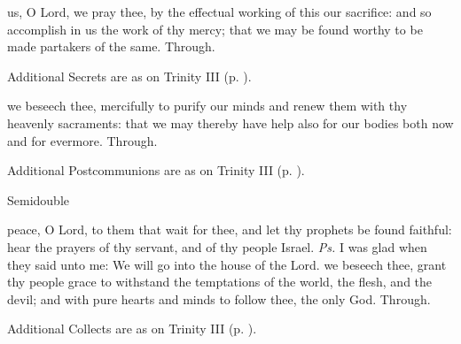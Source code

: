\vspace{-1ex}
\secret
{} us, O Lord, we pray thee, by the effectual working of this our sacrifice: and so accomplish in us the work of thy mercy; that we may be found worthy to be made partakers of the same. Through.
\begin{rubric}
    Additional Secrets are as on Trinity III (p. \pageref{TrinityIII}).
\end{rubric}
\vspace{-0.5ex}
\postcommunion
{} we beseech thee, mercifully to purify our minds and renew them with thy heavenly sacraments: that we may thereby have help also for our bodies both now and for evermore. Through.
\begin{rubric}
    Additional Postcommunions are as on Trinity III (p. \pageref{TrinityIII}).
\end{rubric}

\begin{inhead}
{Semidouble}
\end{inhead}
\par\noindent
{}


\introit
{} peace, O Lord, to them that wait for thee, and let thy prophets be found faithful: hear the prayers of thy servant, and of thy people Israel. \textit{Ps.} I was glad when they said unto me: We will go into the house of the Lord.
\collect
{} we beseech thee, grant thy people grace to withstand the temptations of the world, the flesh, and the devil; and with pure hearts and minds to follow thee, the only God. Through.
\begin{rubric}
    Additional Collects are as on Trinity III (p. \pageref{TrinityIII}).
\end{rubric}

